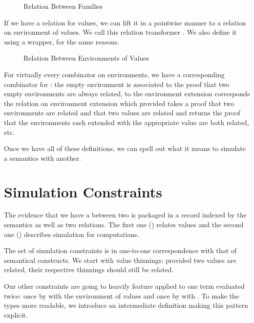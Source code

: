 \begin{figure}[h]
\caption{Relation Between  Families}
\end{figure}

If we have a relation for values, we can lift it in a pointwise manner to a relation
on environment of values. We call this relation transformer . We also define
it using a  wrapper, for the same reasons.

\begin{figure}[h]
\caption{Relation Between Environments of Values}
\end{figure}

For virtually every combinator on environments, we have a corresponding combinator
for : the empty environment  is associated to  the proof that
two empty environments are always related, to the environment extension  
corresponds the relation on environment extension  which provided takes a
proof that two environments are related and that two values are related and returns
the proof that the environments each extended with the appropriate value are both
related, etc.

Once we have all of these definitions, we can spell out what it means to simulate
a semantics with another.

\section{Simulation Constraints}

The evidence that we have a  between two  is
packaged in a record indexed by the semantics as well as two relations.
The first one () relates values and the second one ()
describes simulation for computations.


The set of simulation constraints is in one-to-one correspondence with that of
semantical constructs. We start with value thinnings: provided two values are
related, their respective thinnings should still be related.


Our other constraints are going to heavily feature  applied to one term evaluated
twice: once by  with the environment of values  and once by  with
. To make the types more readable, we introduce an intermediate definition 
making this pattern explicit.


